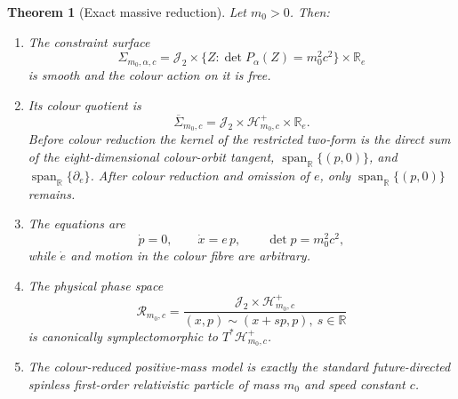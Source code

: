 \documentclass[11pt]{article}
\newtheorem{theorem}{Theorem}[section]
\newcommand{\J}{\mathcal J_2}
\newcommand{\SpanR}{\operatorname{span}_{\mathbb R}}
\begin{document}
\begin{theorem}[Exact massive reduction]
\label{wpr:thm:massive}
Let \(m_0>0\).  Then:
\begin{enumerate}[label=\textup{(\alph*)}]
\item The constraint surface
\[
 \Sigma_{m_0,\alpha,c}
 =\J\times\{Z:\det P_\alpha(Z)=m_0^2c^2\}\times\mathbb R_e
\]
is smooth and the colour action on it is free.
\item Its colour quotient is
\[
 \overline\Sigma_{m_0,c}
 =\J\times\mathcal H^+_{m_0,c}\times\mathbb R_e.
\]
Before colour reduction the kernel of the restricted two-form is the
direct sum of the eight-dimensional colour-orbit tangent,
\(\SpanR\{(p,0)\}\), and \(\SpanR\{\partial_e\}\).  After colour
reduction and omission of \(e\), only \(\SpanR\{(p,0)\}\) remains.
\item The equations are
\[
 \dot p=0,\qquad \dot x=e\,p,\qquad
 \det p=m_0^2c^2,
\]
while \(\dot e\) and motion in the colour fibre are arbitrary.
\item The physical phase space
\[
 \mathcal R_{m_0,c}
 =
 \frac{\J\times\mathcal H^+_{m_0,c}}
 {(x,p)\sim(x+s p,p),\ s\in\mathbb R}
\]
is canonically symplectomorphic to \(T^*\mathcal H^+_{m_0,c}\).
\item The colour-reduced positive-mass model is exactly the standard
future-directed spinless first-order relativistic particle of mass
\(m_0\) and speed constant \(c\).
\end{enumerate}
\end{theorem}
\end{document}
